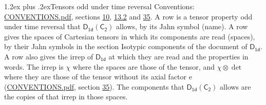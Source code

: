 \documentclass[10pt,a4paper]{article}
\makeatletter
\renewcommand\section{\@startsection{section}{1}{\z@}{-3ex plus -1ex minus -.2ex}%
  {1.2ex plus .2ex}{\normalfont\large\sffamily\bfseries\color{parttitle}}}
\numberwithin{equation}{section}
\newcommand{\grp}[1]{\mathsf{#1}}
\newcommand{\irrprod}{\otimes}
\makeatother
\begin{document}
\section{Tensors odd under time reversal}\label{s:time_odd}
Conventions: \href{../../CONVENTIONS.pdf}{CONVENTIONS.pdf}, sections \href{../../../rotation/CONVENTIONS.pdf\#conv.10}{10}, \href{../../../rotation/CONVENTIONS.pdf\#conv.13.2}{13.2} and \href{../../CONVENTIONS.pdf\#conv.35}{35}.
\leavevmode\label{n:head.name.property}A row is a tensor property odd under time reversal that $\grp{D_{1d}}(\grp{C_{2}})$ allows, by its Jahn symbol (name). \label{n:head.spaces}A row gives the spaces of Cartesian tensors in which its components are read (spaces), by their Jahn symbols in the section Isotypic components of the document of \href{../../../rotation/data/pdf/D1d.pdf}{$\grp{D_{1d}}$}. \label{n:head.properties}A row also gives the irrep of $\grp{D_{1d}}$ at which they are read and the properties in words. The irrep is $\chi$ where the spaces are those of the tensor, and $\chi \irrprod \det$ where they are those of the tensor without its axial factor e (\href{../../CONVENTIONS.pdf}{CONVENTIONS.pdf}, section \href{../../CONVENTIONS.pdf\#conv.35}{35}). The components that $\grp{D_{1d}}(\grp{C_{2}})$ allows are the copies of that irrep in those spaces.
\end{document}
